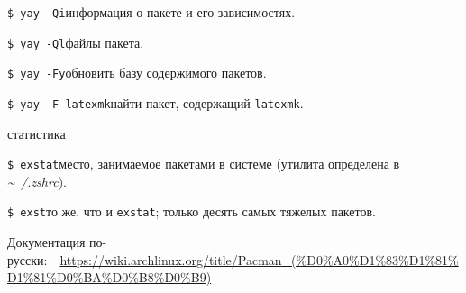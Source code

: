 \documentclass[
a4paper
,11pt
,landscape
,russian
,twocolumn
]{letter}
\newcommand\hsp{\hspace{.2in}}
\newcommand\vsp{\vspace{.2in}}
\begin{document}
\vsp

\texttt{\$ yay -Qi}\hsp информация о пакете и его зависимостях.

\texttt{\$ yay -Ql}\hsp файлы пакета.

\texttt{\$ yay -Fy}\hsp обновить базу содержимого пакетов.

\texttt{\$ yay -F latexmk}\hsp найти пакет, содержащий \texttt{latexmk}.

\vsp

\begin{Large}
	статистика
\end{Large}

\vsp

\texttt{\$ exstat}\hsp место, занимаемое пакетами в системе
(утилита определена в \textit{\~~/.zshrc}).

\texttt{\$ exst}\hsp то же, что и \texttt{exstat}; только десять
самых тяжелых пакетов.

\vsp

Документация
\newline
по-русски:~~\url{https://wiki.archlinux.org/title/Pacman_(%D0%A0%D1%83%D1%81%D1%81%D0%BA%D0%B8%D0%B9)}
\end{document}
